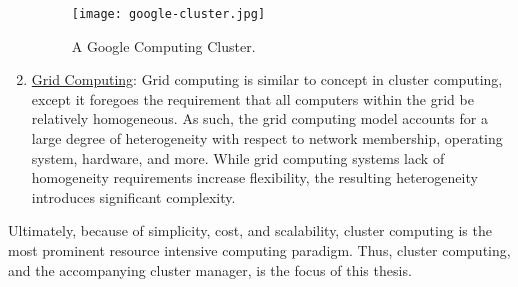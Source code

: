 \begin{enumerate}
    \begin{figure}[!h]
      \centerline{\texttt{[image: google-cluster.jpg]}}
      \caption{A Google Computing Cluster.\cite{image-google-cluster}}
    \end{figure}

  \item \underline{Grid Computing}: Grid computing is similar to concept in
    cluster computing, except it foregoes the requirement that all computers
    within the grid be relatively homogeneous. As such, the grid computing model accounts
    for a large degree of heterogeneity with respect to network membership,
    operating system, hardware, and more.\cite[pg.
    18]{distributed-systems-principles-and-paradigms} While grid computing
    systems lack of homogeneity requirements increase flexibility,
    the resulting heterogeneity introduces significant complexity.

\end{enumerate}

Ultimately, because of simplicity, cost, and scalability, cluster computing is
the most prominent resource intensive computing paradigm. Thus, cluster
computing, and the accompanying cluster manager, is the focus of this
thesis.

